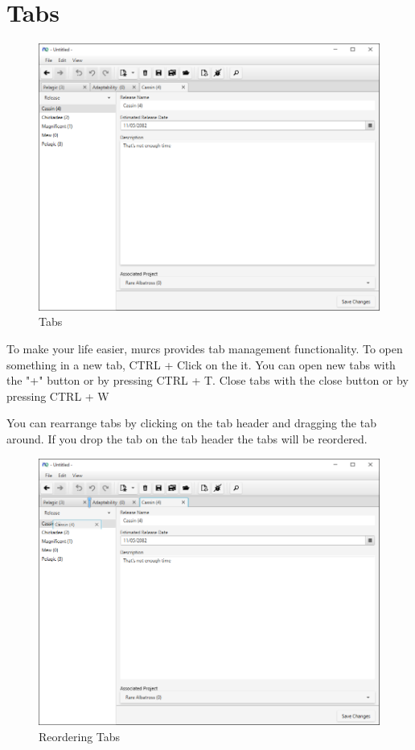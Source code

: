 \section{Tabs}

\begin{figure}[H]
\centering
\includegraphics[width=\textwidth]{images/screenshots/tabs1.png}
\caption{Tabs}
\label{fig:revert}
\end{figure}

To make your life easier, murcs provides tab management functionality. To open something in a new tab, CTRL + Click on the it. You can open new tabs with the "+" button or by pressing CTRL + T. Close tabs with the close button or by pressing CTRL + W


You can rearrange tabs by clicking on the tab header and dragging the tab around. If you drop the tab on the tab header the tabs will be reordered.

\begin{figure}[H]
\centering
\includegraphics[width=\textwidth]{images/screenshots/tabs2.png}
\caption{Reordering Tabs}
\label{fig:revert}
\end{figure}

